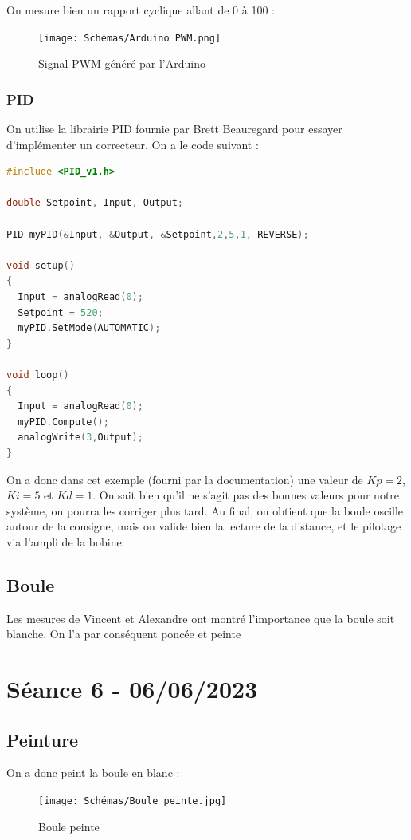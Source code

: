 \documentclass[11pt,a4paper]{article}
\begin{document}
On mesure bien un rapport cyclique allant de 0 à 100 :

\begin{figure} [H]
\begin{center}
\texttt{[image: Schémas/Arduino PWM.png]} 
\end{center}
\caption{Signal PWM généré par l'Arduino}
\end{figure}

\subsubsection{PID}
On utilise la librairie PID fournie par Brett Beauregard pour essayer d'implémenter un correcteur. On a le code suivant : 
\begin{lstlisting}[language = C]
#include <PID_v1.h>

double Setpoint, Input, Output;

PID myPID(&Input, &Output, &Setpoint,2,5,1, REVERSE);

void setup()
{
  Input = analogRead(0);
  Setpoint = 520;
  myPID.SetMode(AUTOMATIC);
}

void loop()
{
  Input = analogRead(0);
  myPID.Compute();
  analogWrite(3,Output);
}
\end{lstlisting}

On a donc dans cet exemple (fourni par la documentation) une valeur de $Kp = 2$,  $Ki = 5$ et $Kd = 1$. On sait bien qu'il ne s'agit pas des bonnes valeurs pour notre système, on pourra les corriger plus tard. Au final, on obtient que la boule oscille autour de la consigne, mais on valide bien la lecture de la distance, et le pilotage via l'ampli de la bobine.

\subsection{Boule}
Les mesures de Vincent et Alexandre ont montré l'importance que la boule soit blanche. On l'a par conséquent poncée et peinte

\section{Séance 6 - 06/06/2023}
\subsection{Peinture}
On a donc peint la boule en blanc :
\begin{figure} [H]
\begin{center}
\texttt{[image: Schémas/Boule peinte.jpg]} 
\end{center}
\caption{Boule peinte}
\end{figure}
\end{document}
